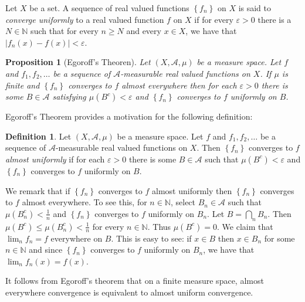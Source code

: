 \documentclass[12pt]{article}
\newtheorem{proposition}[theorem]{Proposition}
\theoremstyle{definition}
\newtheorem{definition}[theorem]{Definition}
\theoremstyle{remark}
\theoremstyle{plain}
\newcommand{\N}{\mathbb N}
\newcommand{\scrA}{{\mathscr A}}
\begin{document}
Let $X$ be a set. A sequence of real valued functions $\left\{ f_n \right\}$ on $X$ is said to \textit{converge uniformly} to a real valued function $f$ on $X$ if for every $\varepsilon > 0$ there is a $N \in \N$ such that for every $n\ge N$ and every $x\in X$, we have that $|f_n (x) - f(x)| < \varepsilon$.

\begin{proposition}[Egoroff's Theoren]
    Let $\left( X, \scrA , \mu \right)$ be a measure space. Let $f$ and $f_1 , f_2 , \ldots$ be a sequence of $\scrA$-measurable real valued functions on $X$. If $\mu$ is finite and $\left\{ f_n \right\}$ converges to $f$ almost everywhere then for each $\varepsilon >0$ there is some $B\in \scrA$ satisfying $\mu \left( B^c \right) < \varepsilon$ and $\left\{ f_n \right\} $ converges to $f$ uniformly on $B$.
\end{proposition}

Egoroff's Theorem provides a motivation for the following definition: 
\begin{definition}
    Let $\left( X, \scrA , \mu \right)$ be a measure space. Let $f$ and $f_1 , f_2 , \ldots$ be a sequence of $\scrA$-measurable real valued functions on $X$. Then $\left\{ f_n \right\}$ converges to $f$ \textit{almost uniformly} if for each $\varepsilon > 0$ there is some $B\in \scrA$ such that $\mu \left( B^c \right) < \varepsilon$ and $\left\{ f_n \right\} $ converges to $f$ uniformly on $B$.
\end{definition}

We remark that if $\left\{ f_n \right\}$ converges to $f$ almost uniformly then $\left\{ f_n \right\}$ converges to $f$ almost everywhere. To see this, for $n\in\N $, select $B_n \in \scrA$ such that $\mu \left( B_n ^c \right) < \frac{1}{n}$ and $\left\{ f_n \right\}$ converges to $f$ uniformly on $B_n$. Let $B=\bigcap_n {B_n}$. Then $\mu (B^c) \le \mu (B_n ^c) < \frac{1}{n} $ for every $n\in\N$. Thus $\mu \left( B^c \right)=0$. We claim that $\lim_n f_n = f$ everywhere on $B$. This is easy to see: if $x\in B$ then $x\in B_n$ for some $n\in\N$ and since $\left\{ f_n \right\}$ converges to $f$ uniformly on $B_n$, we have that $\lim_n f_n \left( x \right) = f\left( x \right)$.

It follows from Egoroff's theorem that on a finite measure space, almost everywhere convergence is equivalent to almost uniform convergence.
\end{document}
